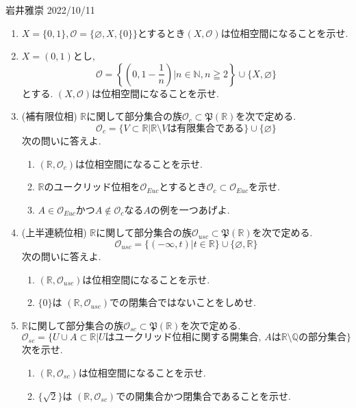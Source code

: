 \documentclass[dvipdfmx,a4paper,11pt]{article}
\newcommand{\R}{\mathbb{R}}
\newcommand{\Q}{\mathbb{Q}}
\newcommand{\N}{\mathbb{N}}
\theoremstyle{definition}
\begin{document}
\begin{flushright}
 岩井雅崇 2022/10/11
\end{flushright}
\begin{enumerate}[ label=\textbf{問}2.\arabic*]
\item $X = \{ 0,1\}, \mathscr{O} = \{ \varnothing, X, \{0\} \}$とするとき$(X, \mathscr{O})$は位相空間になることを示せ.

\item $X = (0,1)$とし, 
$$
\mathscr{O} = \left\{ \left(0,1 - \frac{1}{n}\right)| n \in \N, n \geqq 2 \right\} \cup \{ X,\varnothing \}
$$
とする. $(X, \mathscr{O})$は位相空間になることを示せ.

\item (補有限位相)
$\R$に関して部分集合の族$\mathscr{O}_c \subset \mathfrak{P}(\R)$を次で定める.
$$
\mathscr{O}_c = \{V \subset \R | \text{$\R \setminus V$は有限集合である} \} \cup \{  \varnothing  \}
$$
次の問いに答えよ.
	\begin{enumerate}
	\item $(\R,\mathscr{O}_c)$は位相空間になることを示せ.
	\item $\R$のユークリッド位相を$\mathscr{O}_{Euc}$とするとき$\mathscr{O}_c  \subset \mathscr{O}_{Euc}$を示せ. 
	\item $A \in \mathscr{O}_{Euc}$かつ$A \not \in \mathscr{O}_c$なる$A$の例を一つあげよ.
	\end{enumerate}
	
\item (上半連続位相) $\R$に関して部分集合の族$\mathscr{O}_{usc} \subset \mathfrak{P}(\R)$を次で定める.
$$
\mathscr{O}_{usc} = \{(- \infty,t) | t \in \R \} \cup \{  \varnothing , \R \}
$$
次の問いに答えよ.
	\begin{enumerate}
	\item $(\R,\mathscr{O}_{usc})$は位相空間になることを示せ.
	\item $\{ 0\}$は $(\R,\mathscr{O}_{usc})$での閉集合ではないことをしめせ. 
	\end{enumerate}
	
\item $\R$に関して部分集合の族$\mathscr{O}_{sc} \subset \mathfrak{P}(\R)$を次で定める.
$$
\mathscr{O}_{sc}  = \{U \cup A \subset \R | \text{$U$はユークリッド位相に関する開集合, $A$は$\R \setminus \Q$の部分集合}\}
$$
次を示せ.
	\begin{enumerate}
	\item $(\R,\mathscr{O}_{sc} )$は位相空間になることを示せ.
	\item $\{ \sqrt{2}\}$は $(\R,\mathscr{O}_{sc} )$での開集合かつ閉集合であることを示せ.
	\end{enumerate}
	

\end{enumerate}
\end{document}
